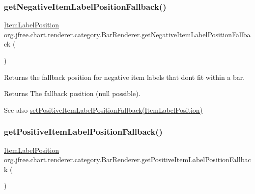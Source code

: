 \subsubsection{\texorpdfstring{get\+Negative\+Item\+Label\+Position\+Fallback()}{getNegativeItemLabelPositionFallback()}}
{\footnotesize\ttfamily \mbox{\hyperlink{classorg_1_1jfree_1_1chart_1_1labels_1_1_item_label_position}{Item\+Label\+Position}} org.\+jfree.\+chart.\+renderer.\+category.\+Bar\+Renderer.\+get\+Negative\+Item\+Label\+Position\+Fallback (\begin{DoxyParamCaption}{ }\end{DoxyParamCaption})}

Returns the fallback position for negative item labels that don\textquotesingle{}t fit within a bar.

\begin{DoxyReturn}{Returns}
The fallback position ({\ttfamily null} possible).
\end{DoxyReturn}
\begin{DoxySeeAlso}{See also}
\mbox{\hyperlink{classorg_1_1jfree_1_1chart_1_1renderer_1_1category_1_1_bar_renderer_a2e03b899d718a6329c5ca2096704c937}{set\+Positive\+Item\+Label\+Position\+Fallback(\+Item\+Label\+Position)}} 
\end{DoxySeeAlso}
\mbox{\label{classorg_1_1jfree_1_1chart_1_1renderer_1_1category_1_1_bar_renderer_ab0ba3e927e89df53d9585f80b2a67222}} 
\subsubsection{\texorpdfstring{get\+Positive\+Item\+Label\+Position\+Fallback()}{getPositiveItemLabelPositionFallback()}}
{\footnotesize\ttfamily \mbox{\hyperlink{classorg_1_1jfree_1_1chart_1_1labels_1_1_item_label_position}{Item\+Label\+Position}} org.\+jfree.\+chart.\+renderer.\+category.\+Bar\+Renderer.\+get\+Positive\+Item\+Label\+Position\+Fallback (\begin{DoxyParamCaption}{ }\end{DoxyParamCaption})}

